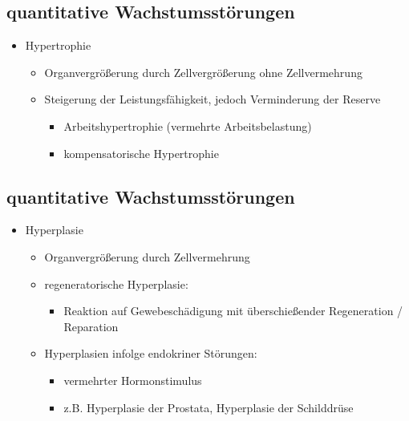 \begin{it>emize}
\begin{itemize}
\subsection{quantitative Wachstumsstörungen}
\begin{itemize}
\item Hypertrophie
\begin{itemize}
\item Organvergrößerung durch Zellvergrößerung ohne Zellvermehrung
\item Steigerung der Leistungsfähigkeit, jedoch Verminderung der Reserve
\begin{itemize}
\item Arbeitshypertrophie (vermehrte Arbeitsbelastung)
\item kompensatorische Hypertrophie
\end{itemize}
\end{itemize}
\end{itemize}

\subsection{quantitative Wachstumsstörungen}
\begin{itemize}
\item Hyperplasie
\begin{itemize}
\item Organvergrößerung durch Zellvermehrung
\item regeneratorische Hyperplasie:
\begin{itemize}
\item Reaktion auf Gewebeschädigung mit überschießender Regeneration / Reparation
\end{itemize}
\item Hyperplasien infolge endokriner Störungen:
\begin{itemize}
\item vermehrter Hormonstimulus
\item z.B. Hyperplasie der Prostata, Hyperplasie der Schilddrüse
\end{itemize}
\end{itemize}
\end{itemize}


\end{itemize}
\end{it>emize}
